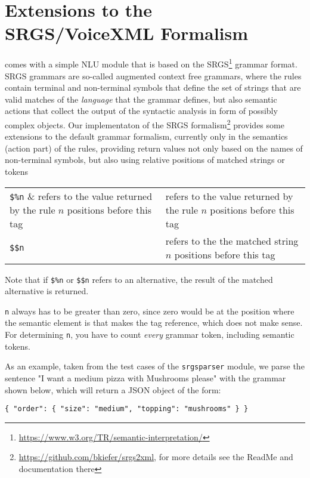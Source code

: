 \section{Extensions to the SRGS/VoiceXML Formalism} \label{sec:srgs}
\vonda comes with a simple NLU module that is based on the
SRGS\footnote{\url{ https://www.w3.org/TR/semantic-interpretation/}}
grammar format. SRGS grammars are so-called augmented context free
grammars, where the rules contain terminal and non-terminal symbols
that define the set of strings that are valid matches of the
\emph{language} that the grammar defines, but also semantic actions
that collect the \textrm{output} of the syntactic analysis in form of
possibly complex objects. Our implementaton of the SRGS
formalism\footnote{\url{https://github.com/bkiefer/srgs2xml}, for more details see the
  ReadMe and documentation there} provides some extensions to the
default grammar formalism, currently only in the semantics (action
part) of the rules, providing return values not only based on the names of non-terminal symbols, but also using relative positions of matched strings or tokens

\vspace*{1ex}
\begin{tabular}{ll}
\verb|$%n| & refers to the value returned by the rule $n$ positions before this tag\\
\verb|$$n| & refers to the the matched string $n$ positions before this tag\\
\end{tabular}
\vspace*{1ex}

Note that if \verb|$%n| or \verb|$$n| refers to an alternative, the result of the matched alternative is returned.

\texttt{n} always has to be greater than zero, since zero would be at the position
where the semantic element is that makes the tag reference, which does not make
sense. For determining \texttt{n}, you have to count \emph{every} grammar token,
including semantic tokens.

As an example, taken from the test cases of the \texttt{srgsparser}
module, we parse the sentence "I want a medium pizza with Mushrooms
please" with the grammar shown below, which will return a JSON object
of the form:

\vspace*{1ex}
\verb|{ "order": { "size": "medium", "topping": "mushrooms" } }|
\vspace*{1ex}

